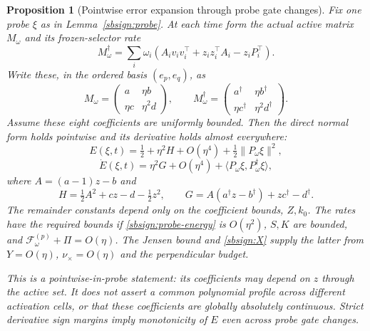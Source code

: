 \documentclass{article} %
\theoremstyle{plain}
\newtheorem{proposition}[theorem]{Proposition}
\theoremstyle{definition}
\theoremstyle{remark}
\begin{document}
\begin{proposition}[Pointwise error expansion through probe gate changes]
\label{sbsign:switching}
Fix one probe $\xi$ as in Lemma~\ref{sbsign:probe}. At each time form
the actual active matrix $M_\omega$ and its frozen-selector rate
\[
 M_\omega^\dagger=\sum_i\omega_i
 (A_iv_iv_i^\top+z_iz_i^\top A_i-z_iP_i^\top).
\]
Write these, in the ordered basis $(e_p,e_q)$, as
\[
 M_\omega=\begin{pmatrix}a&\eta b\\\eta c&\eta^2d\end{pmatrix},\qquad
 M_\omega^\dagger=\begin{pmatrix}a^\dagger&\eta b^\dagger\\
 \eta c^\dagger&\eta^2d^\dagger\end{pmatrix}.
\]
Assume these eight coefficients are uniformly bounded. Then the direct
normal form holds pointwise and its derivative holds almost everywhere:
\[
 E(\xi,t)=\tfrac12+\eta^2H+O(\eta^4)+\tfrac12\|P_\omega\xi\|^2,
\]
\[
 \dot E(\xi,t)=\eta^2G+O(\eta^4)
                +\langle P_\omega\xi,P_\omega^\dagger\xi\rangle,
\]
where $A=(a-1)z-b$ and
\[
 H=\tfrac12 A^2+cz-d-\tfrac12z^2,\qquad
 G=A(a^\dagger z-b^\dagger)+zc^\dagger-d^\dagger.
\]
The remainder constants depend only on the coefficient bounds, $Z,k_0$.
The rates have the required bounds if \eqref{sbsign:probe-energy} is
$O(\eta^2)$, $S,K$ are bounded, and
$\mathcal F_\omega^{(p)}+\Pi=O(\eta)$.
The Jensen bound and \eqref{sbsign:X} supply the latter from
$Y=O(\eta)$, $\nu_\times=O(\eta)$ and the perpendicular budget.

This is a pointwise-in-probe statement: its coefficients may depend on
$z$ through the active set. It does not assert a common polynomial profile
across different activation cells, or that these coefficients are globally
absolutely continuous. Strict derivative sign margins imply monotonicity
of $E$ even across probe gate changes.
\end{proposition}
\end{document}

